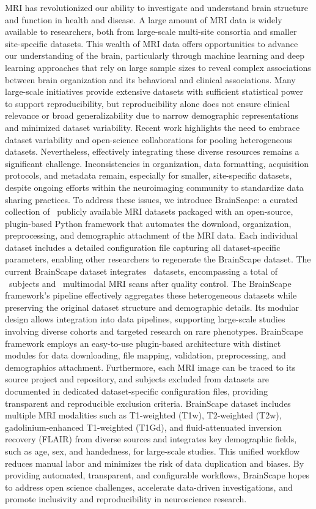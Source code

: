 MRI has revolutionized our ability to investigate and understand brain structure and function in health and disease. 
A large amount of MRI data is widely available to researchers, 
both from large-scale multi-site consortia and smaller site-specific datasets. 
This wealth of MRI data offers opportunities to advance our understanding of the brain, 
particularly through machine learning and deep learning approaches that rely on large sample sizes to reveal complex associations 
between brain organization and its behavioral and clinical associations. 
Many large-scale initiatives provide extensive datasets with sufficient statistical power to support reproducibility, 
but reproducibility alone does not ensure clinical relevance or broad generalizability 
due to narrow demographic representations and minimized dataset variability. 
Recent work highlights the need to embrace dataset variability and open-science collaborations for pooling heterogeneous datasets. 
Nevertheless, effectively integrating these diverse resources remains a significant challenge. 
Inconsistencies in organization, data formatting, acquisition protocols, 
and metadata remain, especially for smaller, site-specific datasets, despite ongoing efforts 
within the neuroimaging community to standardize data sharing practices. 
To address these issues, we introduce BrainScape: a curated collection of \NumDatasets\ publicly available MRI datasets 
packaged with an open-source, plugin-based Python framework that automates the download, organization, preprocessing, and demographic attachment of the MRI data. 
Each individual dataset includes a detailed configuration file capturing all dataset-specific parameters, 
enabling other researchers to regenerate the BrainScape dataset. 
The current BrainScape dataset integrates \NumDatasets\ datasets,
encompassing a total of \TotalSubjectsIncludedAfterInspectionCount\ subjects and \TotalNumMRIs\ multimodal MRI scans after quality control. 
The BrainScape framework's pipeline effectively aggregates these heterogeneous datasets while preserving the original dataset structure and demographic details.
Its modular design allows integration into data pipelines, supporting large-scale studies involving diverse cohorts and targeted research on rare phenotypes. 
BrainScape framework employs an easy-to-use plugin-based architecture with distinct modules for data downloading, file mapping, validation, preprocessing, and demographics attachment. 
Furthermore, each MRI image can be traced to its source project and repository, and subjects excluded from datasets are documented in dedicated dataset-specific configuration files, 
providing transparent and reproducible exclusion criteria.
BrainScape dataset includes multiple MRI modalities such as T1-weighted (T1w), T2-weighted (T2w), 
gadolinium-enhanced T1-weighted (T1Gd), and fluid-attenuated inversion recovery (FLAIR) from diverse sources 
and integrates key demographic fields, such as age, sex, and handedness, for large-scale studies.
This unified workflow reduces manual labor and minimizes the risk of data duplication and biases. 
By providing automated, transparent, and configurable workflows, 
BrainScape hopes to address open science challenges, accelerate data-driven investigations, 
and promote inclusivity and reproducibility in neuroscience research. 
